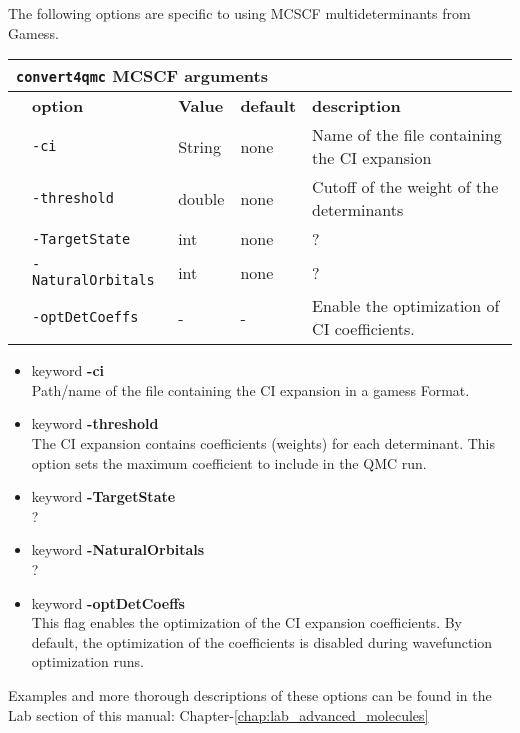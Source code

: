 The following options are specific to using MCSCF multideterminants from Gamess. 

 \begin{table}[h]
 \begin{center}
 \begin{tabularx}{\textwidth}{l l l l l }
 \hline
 \multicolumn{5}{l}{\texttt{convert4qmc} MCSCF arguments} \\
 \hline
    &   \bfseries option      & \bfseries Value & \bfseries default   & \bfseries description \\
    &   \texttt{-ci    } & String     &   none & Name of the file containing the CI expansion  \\
    &   \texttt{-threshold         } &  double    &  none & Cutoff of the weight of the determinants  \\
    &   \texttt{-TargetState      } & int  &  none & ?  \\
    &   \texttt{-NaturalOrbitals      } &  int      &  none   & ?  \\
    &   \texttt{-optDetCoeffs      } &  -      &   - & Enable the optimization of CI coefficients. \\
    \hline
     \end{tabularx}
 \end{center}
 \end{table}
\begin{itemize}
\item keyword \textbf{-ci}\\
Path/name of the file containing the CI expansion in a gamess Format.
\item keyword \textbf{-threshold}\\
The CI expansion contains coefficients (weights) for each determinant. This option sets the maximum coefficient to include in the QMC run. 
\item keyword \textbf{-TargetState}\\
?
\item keyword \textbf{-NaturalOrbitals}\\
?
\item keyword \textbf{-optDetCoeffs}\\
This flag enables the optimization of the CI expansion coefficients. By default, the optimization of the coefficients is disabled during wavefunction optimization runs. 
\end{itemize}

Examples and more thorough descriptions of these options can be found in the Lab section of this manual: Chapter-\ref{chap:lab_advanced_molecules}\\

